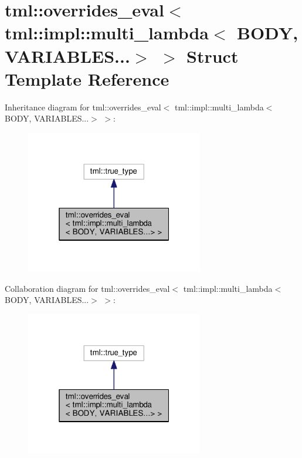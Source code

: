 \hypertarget{structtml_1_1overrides__eval_3_01tml_1_1impl_1_1multi__lambda_3_01_b_o_d_y_00_01_v_a_r_i_a_b_l_e_s_8_8_8_4_01_4}{\section{tml\+:\+:overrides\+\_\+eval$<$ tml\+:\+:impl\+:\+:multi\+\_\+lambda$<$ B\+O\+D\+Y, V\+A\+R\+I\+A\+B\+L\+E\+S...$>$ $>$ Struct Template Reference}
\label{structtml_1_1overrides__eval_3_01tml_1_1impl_1_1multi__lambda_3_01_b_o_d_y_00_01_v_a_r_i_a_b_l_e_s_8_8_8_4_01_4}
}


Inheritance diagram for tml\+:\+:overrides\+\_\+eval$<$ tml\+:\+:impl\+:\+:multi\+\_\+lambda$<$ B\+O\+D\+Y, V\+A\+R\+I\+A\+B\+L\+E\+S...$>$ $>$\+:
\nopagebreak
\begin{figure}[H]
\begin{center}
\leavevmode
\includegraphics[width=220pt]{structtml_1_1overrides__eval_3_01tml_1_1impl_1_1multi__lambda_3_01_b_o_d_y_00_01_v_a_r_i_a_b_l_e_s_8_8_8_4_01_4__inherit__graph}
\end{center}
\end{figure}


Collaboration diagram for tml\+:\+:overrides\+\_\+eval$<$ tml\+:\+:impl\+:\+:multi\+\_\+lambda$<$ B\+O\+D\+Y, V\+A\+R\+I\+A\+B\+L\+E\+S...$>$ $>$\+:
\nopagebreak
\begin{figure}[H]
\begin{center}
\leavevmode
\includegraphics[width=220pt]{structtml_1_1overrides__eval_3_01tml_1_1impl_1_1multi__lambda_3_01_b_o_d_y_00_01_v_a_r_i_a_b_l_e_s_8_8_8_4_01_4__coll__graph}
\end{center}
\end{figure}


